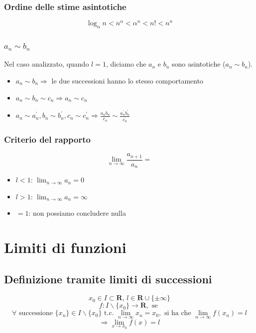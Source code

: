 \documentclass{report}
\begin{document}
    \subsubsection{Ordine delle stime asintotiche}
        $$\log_{\alpha}n < n^{\alpha} < \alpha^n < n! < n^n$$ 
    \subsubsection{$a_n \sim b_n$}
        Nel caso analizzato, quando $l = 1$, diciamo che $a_n$ e $b_n$ sono 
        asintotiche ($a_n \sim b_n$). \\
        \begin{itemize}
            \item $a_n \sim b_n \Longrightarrow$ le due successioni hanno lo stesso comportamento
            \item $a_n \sim b_n \sim c_n \Longrightarrow a_n \sim c_n$
            \item $a_n \sim a^{'}_n, b_n \sim b^{'}_n, c_n \sim c^{'}_n \Longrightarrow 
                \frac{a_nb_n}{c_n} \sim \frac{a^{'}_nb^{'}_n}{c^{'}_n}$
        \end{itemize}
    \subsubsection{Criterio del rapporto}
    $$\lim_{n \to \infty} \frac{a_{n+1}}{a_n} = $$
    \begin{itemize}
        \item $l < 1$: $\lim_{n \to \infty}a_n = 0$
        \item $l > 1$: $\lim_{n \to \infty}a_n = \infty$
        \item $= 1$: non possiamo concludere nulla
    \end{itemize}
\section{Limiti di funzioni}
    \subsection{Definizione tramite limiti di successioni}
        $$x_0 \in I \subset \mathbf{R}, \, l \in \mathbf{R} \cup \{\pm\infty\}$$
        $$f: I\backslash\{x_0\} \longrightarrow \mathbf{R}, \textrm{ se }$$
        $$\forall \textrm{ successione } \{x_n\} \in I\backslash\{x_0\} \textrm { t.c. }
            \lim_{n \to \infty} x_n = x_0, \textrm { si ha che } \lim_{n \to \infty} f\left(x_n\right) = l $$
        $$ \Longrightarrow \lim_{x \to x_0} f\left(x\right) = l $$
\end{document}
